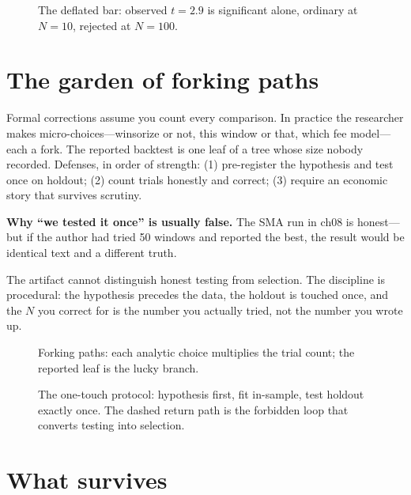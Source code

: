 \begin{figure}[htbp]\centering

\caption{The deflated bar: observed $t=2.9$ is significant alone, ordinary at $N{=}10$,
rejected at $N{=}100$.}
\label{fig:deflated}
\end{figure}

\section{The garden of forking paths}\label{sec:forking}

Formal corrections assume you count every comparison. In practice the researcher makes
micro-choices---winsorize or not, this window or that, which fee model---each a fork. The
reported backtest is one leaf of a tree whose size nobody recorded. Defenses, in order of
strength: (1) pre-register the hypothesis and test once on holdout; (2) count trials
honestly and correct; (3) require an economic story that survives scrutiny.

\begin{example}\label{ex:forking}
\textbf{Why ``we tested it once'' is usually false.} The SMA run in ch08 is honest---but
if the author had tried 50 windows and reported the best, the result would be identical
text and a different truth.
\begin{solution}
The artifact cannot distinguish honest testing from selection. The discipline is
procedural: the hypothesis precedes the data, the holdout is touched once, and the $N$
you correct for is the number you actually tried, not the number you wrote up.
\end{solution}
\end{example}

\begin{figure}[htbp]\centering

\caption{Forking paths: each analytic choice multiplies the trial count; the reported
leaf is the lucky branch.}
\label{fig:forking}
\end{figure}

\begin{figure}[htbp]\centering

\caption{The one-touch protocol: hypothesis first, fit in-sample, test holdout exactly
once. The dashed return path is the forbidden loop that converts testing into selection.}
\label{fig:protocol}
\end{figure}

\section{What survives}\label{sec:survive}

